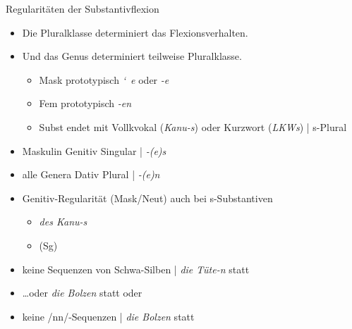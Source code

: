 \begin{frame}
  {Regularitäten der Substantivflexion}
  \pause
  \begin{itemize}[<+->]
    \item \alert{Die Pluralklasse determiniert das Flexionsverhalten.}
    \item \alert{Und das Genus determiniert teilweise Pluralklasse.}
      \begin{itemize}[<+->]
        \item \alert{Mask prototypisch \textit{\char`~e} oder \textit{-e}}
        \item \alert{Fem prototypisch \textit{-en}}
        \item Subst endet mit Vollkvokal (\textit{Kanu-s}) oder Kurzwort (\textit{LKWs}) | s-Plural
      \end{itemize}
    \Halbzeile
  \item \alert{Maskulin Genitiv Singular | \textit{-(e)s}} 
    \item \alert{alle Genera Dativ Plural | \textit{-(e)n}} 
    \item Genitiv-Regularität (Mask/Neut) auch bei s-Substantiven
      \begin{itemize}[<+->]
        \item \textit{des Kanu-s}
        \item {} (Sg)
      \end{itemize}
  \Halbzeile
    \item keine Sequenzen von Schwa-Silben | \textit{die Tüte-n} statt 
    \item \ldots oder \textit{die Bolzen} statt  oder 
    \item keine /nn/-Sequenzen | \textit{die Bolzen} statt 
  \end{itemize}
\end{frame}

